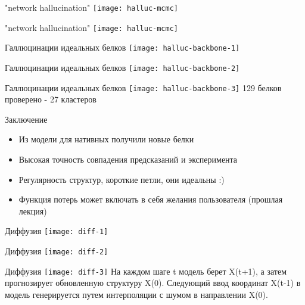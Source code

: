 \begin{frame}{"network hallucination"}
    \centering
    \texttt{[image: halluc-mcmc]}
\end{frame}


\begin{frame}{"network hallucination"}
    \centering
    \texttt{[image: halluc-mcmc]}
\end{frame}


\begin{frame}{Галлюцинации идеальных  белков}
    \centering
    \texttt{[image: halluc-backbone-1]}
\end{frame}

\begin{frame}{Галлюцинации идеальных  белков}
    \centering
    \texttt{[image: halluc-backbone-2]}
\end{frame}

\begin{frame}{Галлюцинации идеальных  белков}
    \centering
    \texttt{[image: halluc-backbone-3]}
    129 белков проверено - 27 кластеров
\end{frame}


\begin{frame}{Заключение}
        \begin{itemize}
            \item Из модели для нативных получили новые белки
            \item Высокая точность совпадения предсказаний и эксперимента
            \item Регулярность структур, короткие петли, они идеальны :)
            \item Функция потерь может включать в себя желания пользователя (прошлая лекция)
            \end{itemize}        
\end{frame}



\begin{frame}{Диффузия}
    \centering
    \texttt{[image: diff-1]}
\end{frame}

\begin{frame}{Диффузия}
    \centering
    \texttt{[image: diff-2]}
\end{frame}

\begin{frame}{Диффузия}
    \centering
    \texttt{[image: diff-3]}
     На каждом  шаге t модель берет X(t+1), а затем прогнозирует обновленную структуру X(0). Следующий ввод координат X(t-1) в модель генерируется
     путем интерполяции с шумом в направлении X(0).
\end{frame}


